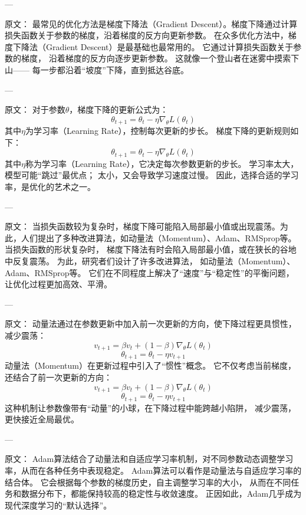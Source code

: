 ---

原文：
最常见的优化方法是梯度下降法（Gradient Descent）。梯度下降通过计算损失函数关于参数的梯度，沿着梯度的反方向更新参数。
在众多优化方法中，梯度下降法（Gradient Descent）是最基础也最常用的。  
它通过计算损失函数关于参数的梯度，  
沿着梯度的反方向逐步更新参数。  
这就像一个登山者在迷雾中摸索下山——  
每一步都沿着“坡度”下降，直到抵达谷底。

---

原文：
对于参数$\theta$，梯度下降的更新公式为：
$$
\theta_{t+1} = \theta_t - \eta \nabla_\theta L(\theta_t)
$$
其中$\eta$为学习率（Learning Rate），控制每次更新的步长。
梯度下降的更新规则如下：
$$
\theta_{t+1} = \theta_t - \eta \nabla_\theta L(\theta_t)
$$  
其中$\eta$称为学习率（Learning Rate），它决定每次参数更新的步长。  
学习率太大，模型可能“跳过”最优点；  
太小，又会导致学习速度过慢。  
因此，选择合适的学习率，是优化的艺术之一。

---

原文：
当损失函数较为复杂时，梯度下降可能陷入局部最小值或出现震荡。为此，人们提出了多种改进算法，如动量法（Momentum）、Adam、RMSprop等。
当损失函数的形状复杂时，  
梯度下降法有时会陷入局部最小值，或在狭长的谷地中反复震荡。  
为此，研究者们设计了许多改进算法，  
如动量法（Momentum）、Adam、RMSprop等。  
它们在不同程度上解决了“速度”与“稳定性”的平衡问题，  
让优化过程更加高效、平滑。

---

原文：
动量法通过在参数更新中加入前一次更新的方向，使下降过程更具惯性，减少震荡：
$$
v_{t+1} = \beta v_t + (1 - \beta) \nabla_\theta L(\theta_t)
$$
$$
\theta_{t+1} = \theta_t - \eta v_{t+1}
$$
动量法（Momentum）在更新过程中引入了“惯性”概念。  
它不仅考虑当前梯度，还结合了前一次更新的方向：  
$$
v_{t+1} = \beta v_t + (1 - \beta) \nabla_\theta L(\theta_t)
$$  
$$
\theta_{t+1} = \theta_t - \eta v_{t+1}
$$  
这种机制让参数像带有“动量”的小球，在下降过程中能跨越小陷阱，  
减少震荡，更快接近全局最优。

---

原文：
Adam算法结合了动量法和自适应学习率机制，对不同参数动态调整学习率，从而在各种任务中表现稳定。
Adam算法可以看作是动量法与自适应学习率的结合体。  
它会根据每个参数的梯度历史，自主调整学习率的大小，  
从而在不同任务和数据分布下，都能保持较高的稳定性与收敛速度。  
正因如此，Adam几乎成为现代深度学习的“默认选择”。

